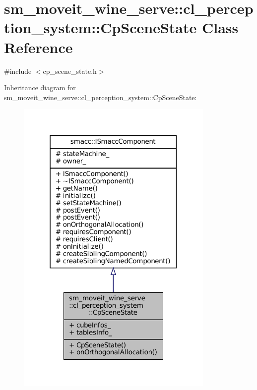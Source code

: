 \hypertarget{classsm__moveit__wine__serve_1_1cl__perception__system_1_1CpSceneState}{}\section{sm\+\_\+moveit\+\_\+wine\+\_\+serve\+:\+:cl\+\_\+perception\+\_\+system\+:\+:Cp\+Scene\+State Class Reference}
\label{classsm__moveit__wine__serve_1_1cl__perception__system_1_1CpSceneState}


{\ttfamily \#include $<$cp\+\_\+scene\+\_\+state.\+h$>$}



Inheritance diagram for sm\+\_\+moveit\+\_\+wine\+\_\+serve\+:\+:cl\+\_\+perception\+\_\+system\+:\+:Cp\+Scene\+State\+:
\nopagebreak
\begin{figure}[H]
\begin{center}
\leavevmode
\includegraphics[width=271pt]{classsm__moveit__wine__serve_1_1cl__perception__system_1_1CpSceneState__inherit__graph}
\end{center}
\end{figure}



